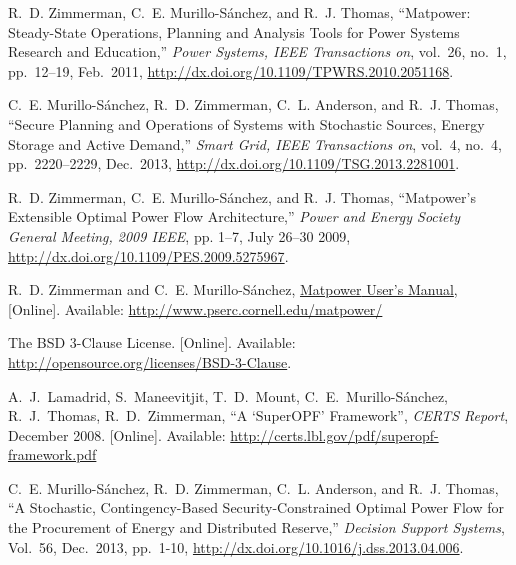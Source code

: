 \documentclass[12pt]{article}
\newcommand{\mpver}[0]{6.0}
\newcommand{\matpower}[0]{{\sc Matpower}}
\newcommand{\matpowerurl}[0]{http://www.pserc.cornell.edu/matpower/}
\newcommand{\mumurl}[0]{http://www.pserc.cornell.edu/matpower/docs/MATPOWER-manual-\mpver.pdf}
\newcommand{\mum}[0]{\href{\mumurl}{\matpower{} User's Manual}}
\numberwithin{equation}{section}
\numberwithin{table}{section}
\numberwithin{figure}{section}
\begin{document}
\clearpage
\begin{thebibliography}{99}
R.~D. Zimmerman, C.~E. Murillo-S{\'a}nchez, and R.~J. Thomas,
  ``\matpower{}: Steady-State Operations, Planning and Analysis Tools for Power Systems Research and Education,'' \emph{Power Systems, IEEE Transactions on}, vol.~26, no.~1, pp.~12--19, Feb.~2011,
\url{http://dx.doi.org/10.1109/TPWRS.2010.2051168}.

C.~E. Murillo-S{\'a}nchez, R.~D. Zimmerman, C.~L. Anderson, and R.~J. Thomas, ``Secure Planning and Operations of Systems with Stochastic Sources, Energy Storage and Active Demand,'' \emph{Smart Grid, IEEE Transactions on}, vol.~4, no.~4, pp.~2220--2229, Dec.~2013,
\url{http://dx.doi.org/10.1109/TSG.2013.2281001}.

R.~D. Zimmerman, C.~E. Murillo-S{\'a}nchez, and R.~J. Thomas, ``\matpower{}'s
  Extensible Optimal Power Flow Architecture,'' \emph{Power and Energy Society
  General Meeting, 2009 IEEE}, pp. 1--7, July 26--30 2009,
  \url{http://dx.doi.org/10.1109/PES.2009.5275967}.

R.~D. Zimmerman and C.~E. Murillo-S{\'a}nchez, \mum{},
  [Online]. Available: \url{\matpowerurl}

The BSD 3-Clause License. [Online]. Available: \url{http://opensource.org/licenses/BSD-3-Clause}.

A.~J.~Lamadrid, S.~Maneevitjit, T.~D.~Mount, C.~E.~Murillo-S{\'a}nchez,
  R.~J.~Thomas, R.~D.~Zimmerman, ``A `SuperOPF' Framework'', \emph{CERTS
  Report}, December 2008.
  [Online]. Available: \url{http://certs.lbl.gov/pdf/superopf-framework.pdf}

C.~E. Murillo-S{\'a}nchez, R.~D. Zimmerman, C.~L. Anderson, and R.~J. Thomas, ``A Stochastic, Contingency-Based Security-Constrained Optimal Power Flow for the Procurement of Energy and Distributed Reserve,'' \emph{Decision Support Systems}, Vol.~56, Dec.~2013, pp.~1-10,
\url{http://dx.doi.org/10.1016/j.dss.2013.04.006}.

\end{thebibliography}
\end{document}
